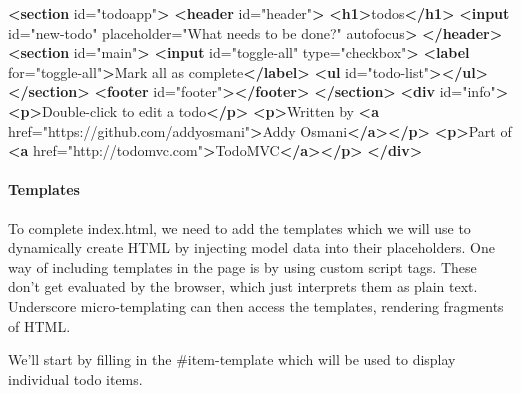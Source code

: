 \documentclass[9pt]{book}
\newenvironment{Shaded}{}{}
\newcommand{\KeywordTok}[1]{\textcolor[rgb]{0.00,0.44,0.13}{\textbf{{#1}}}}
\newcommand{\StringTok}[1]{\textcolor[rgb]{0.25,0.44,0.63}{{#1}}}
\newcommand{\OtherTok}[1]{\textcolor[rgb]{0.00,0.44,0.13}{{#1}}}
\newcommand{\NormalTok}[1]{{#1}}
\begin{document}
\begin{Shaded}
\begin{Highlighting}[]
  \KeywordTok{<section}\OtherTok{ id=}\StringTok{"todoapp"}\KeywordTok{>}
    \KeywordTok{<header}\OtherTok{ id=}\StringTok{"header"}\KeywordTok{>}
      \KeywordTok{<h1>}\NormalTok{todos}\KeywordTok{</h1>}
      \KeywordTok{<input}\OtherTok{ id=}\StringTok{"new-todo"}\OtherTok{ placeholder=}\StringTok{"What needs to be done?"}\OtherTok{ autofocus}\KeywordTok{>}
    \KeywordTok{</header>}
    \KeywordTok{<section}\OtherTok{ id=}\StringTok{"main"}\KeywordTok{>}
      \KeywordTok{<input}\OtherTok{ id=}\StringTok{"toggle-all"}\OtherTok{ type=}\StringTok{"checkbox"}\KeywordTok{>}
      \KeywordTok{<label}\OtherTok{ for=}\StringTok{"toggle-all"}\KeywordTok{>}\NormalTok{Mark all as complete}\KeywordTok{</label>}
      \KeywordTok{<ul}\OtherTok{ id=}\StringTok{"todo-list"}\KeywordTok{></ul>}
    \KeywordTok{</section>}
    \KeywordTok{<footer}\OtherTok{ id=}\StringTok{"footer"}\KeywordTok{></footer>}
  \KeywordTok{</section>}
  \KeywordTok{<div}\OtherTok{ id=}\StringTok{"info"}\KeywordTok{>}
    \KeywordTok{<p>}\NormalTok{Double-click to edit a todo}\KeywordTok{</p>}
    \KeywordTok{<p>}\NormalTok{Written by }\KeywordTok{<a}\OtherTok{ href=}\StringTok{"https://github.com/addyosmani"}\KeywordTok{>}\NormalTok{Addy Osmani}\KeywordTok{</a></p>}
    \KeywordTok{<p>}\NormalTok{Part of }\KeywordTok{<a}\OtherTok{ href=}\StringTok{"http://todomvc.com"}\KeywordTok{>}\NormalTok{TodoMVC}\KeywordTok{</a></p>}
  \KeywordTok{</div>}
\end{Highlighting}
\end{Shaded}

\paragraph{Templates}\label{templates}

To complete index.html, we need to add the templates which we will use
to dynamically create HTML by injecting model data into their
placeholders. One way of including templates in the page is by using
custom script tags. These don't get evaluated by the browser, which just
interprets them as plain text. Underscore micro-templating can then
access the templates, rendering fragments of HTML.

We'll start by filling in the \#item-template which will be used to
display individual todo items.
\end{document}
